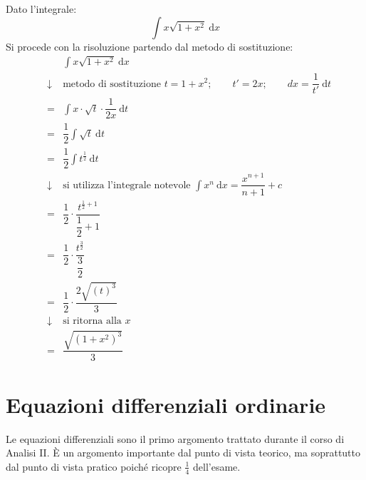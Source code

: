 \documentclass[a4paper]{article}
\begin{document}
	\noindent
	Dato l'integrale:
	\begin{equation*}
		\displaystyle \int x \sqrt{1+x^{2}} \: \mathrm{d}x
	\end{equation*}
	Si procede con la risoluzione partendo dal metodo di sostituzione:
	\begin{equation*}
		\begin{array}{rcl}
			&& \displaystyle \int x \sqrt{1+x^{2}} \: \mathrm{d}x \\ [1.5em]
			&\downarrow& \text{metodo di sostituzione } t = 1 + x^{2}; \hspace{2em} t' = 2x; \hspace{2em} dx = \dfrac{1}{t'} \: \mathrm{d}t \\ [1.5em]
			&=& \displaystyle \int x \cdot \sqrt{t} \cdot \dfrac{1}{2x} \: \mathrm{d}t \\ [2em]
			&=& \displaystyle \dfrac{1}{2} \int \sqrt{t} \: \mathrm{d}t \\ [2em]
			&=& \displaystyle \dfrac{1}{2} \int t^{\frac{1}{2}} \: \mathrm{d}t \\ [1.5em]
			&\downarrow& \text{si utilizza l'integrale notevole }\displaystyle\int x^{n} \: \mathrm{d}x = \dfrac{x^{n+1}}{n+1}+c \\ [1em]
			&=& \dfrac{1}{2} \cdot \dfrac{t^{\frac{1}{2} + 1}}{\dfrac{1}{2} + 1} \\ [2.5em]
			&=& \dfrac{1}{2} \cdot \dfrac{t^{\frac{3}{2}}}{\dfrac{3}{2}} \\ [2.5em]
			&=& \dfrac{1}{2} \cdot \dfrac{2 \sqrt{\left(t\right)^{3}}}{3} \\ [1.5em]
			&\downarrow& \text{si ritorna alla }x \\ [1em]
			&=& \dfrac{\sqrt{\left(1+x^{2}\right)^{3}}}{3}
		\end{array}
	\end{equation*}\newpage

	\section{Equazioni differenziali ordinarie}\label{section: equazioni differenziali ordinarie}

	Le equazioni differenziali sono il primo argomento trattato durante il corso di Analisi II. È un argomento importante dal punto di vista teorico, ma soprattutto dal punto di vista pratico poiché ricopre $\frac{1}{4}$ dell'esame.
\end{document}
